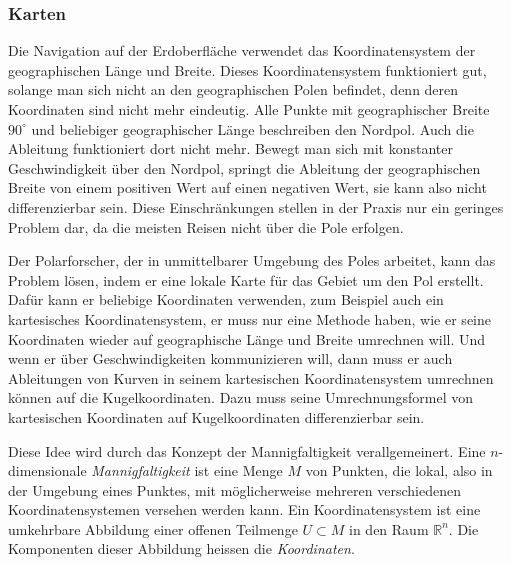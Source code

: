 \subsubsection{Karten}
Die Navigation auf der Erdoberfläche verwendet das Koordinatensystem
der geographischen Länge und Breite.
Dieses Koordinatensystem funktioniert gut, solange man sich nicht an
den geographischen Polen befindet, denn deren Koordinaten sind
nicht mehr eindeutig.
Alle Punkte mit geographischer Breite $90^\circ$ und beliebiger 
geographischer Länge beschreiben den Nordpol.
%
%
%
%
%
Auch die Ableitung funktioniert dort nicht mehr.
Bewegt man sich mit konstanter Geschwindigkeit über den Nordpol,
springt die Ableitung der geographischen Breite von einem positiven
Wert auf einen negativen Wert, sie kann also nicht differenzierbar sein.
Diese Einschränkungen stellen in der Praxis nur ein geringes Problem dar,
da die meisten Reisen nicht über die Pole erfolgen.

Der Polarforscher, der in unmittelbarer Umgebung des Poles arbeitet,
kann das Problem lösen, indem er eine lokale Karte für das Gebiet
um den Pol erstellt.
Dafür kann er beliebige Koordinaten verwenden, zum Beispiel auch
ein kartesisches Koordinatensystem, er muss nur eine Methode haben,
wie er seine Koordinaten wieder auf geographische Länge und Breite
umrechnen will.
Und wenn er über Geschwindigkeiten kommunizieren will, dann muss
er auch Ableitungen von Kurven in seinem kartesischen Koordinatensystem
umrechnen können auf die Kugelkoordinaten.
Dazu muss seine Umrechnungsformel von kartesischen Koordinaten
auf Kugelkoordinaten differenzierbar sein.

Diese Idee wird durch das Konzept der Mannigfaltigkeit verallgemeinert.
Eine $n$-dimensionale {\em Mannigfaltigkeit} ist eine Menge $M$ von Punkten,
die lokal, also in der Umgebung eines Punktes, mit möglicherweise mehreren
verschiedenen Koordinatensystemen versehen werden kann.
Ein Koordinatensystem ist eine umkehrbare Abbildung einer offenen Teilmenge
$U\subset M$ in den Raum $\mathbb{R}^n$.
Die Komponenten dieser Abbildung heissen die {\em Koordinaten}.
%

